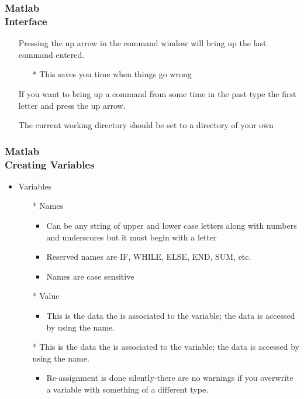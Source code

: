 \documentclass[hyperref={pdfpagelabels=true}]{beamer}
\begin{document}
\begin{frame}
\frametitle{Matlab \\ {\small Interface}}
\begin{itemize}
\item[\ding{39}] Pressing the up arrow in the command window will bring up the last command entered.
  \begin{itemize}
  \item[*] This saves you time when things go wrong
  \end{itemize}
\item[\ding{39}] If you want to bring up a command from some time in the past type the first letter and press the up arrow.
\item[\ding{39}] The current working directory should be set to a directory of your own 
\end{itemize}
\end{frame}

\begin{frame}
\frametitle{Matlab \\ {\small Creating Variables}}
\begin{itemize}
\item Variables
  \begin{itemize}
  \item[*] Names
    \begin{itemize}
     \item Can be any string of upper and lower case letters along with numbers and underscores but it must begin with a letter 
     \item Reserved names are IF, WHILE, ELSE, END, SUM, etc.
     \item Names are case sensitive
    \end{itemize}
  \item[*] Value
    \begin{itemize}
     \item This is the data the is associated to the variable; the data is accessed by using the name.
    \end{itemize}
  \item[*] This is the data the is associated to the variable; the data is accessed by using the name.
     \begin{itemize}
     \item Re-assignment is done silently-there are no warnings if you overwrite a variable with something of a different type.
    \end{itemize}
  \end{itemize}
\end{itemize}
\end{frame}
\end{document}

